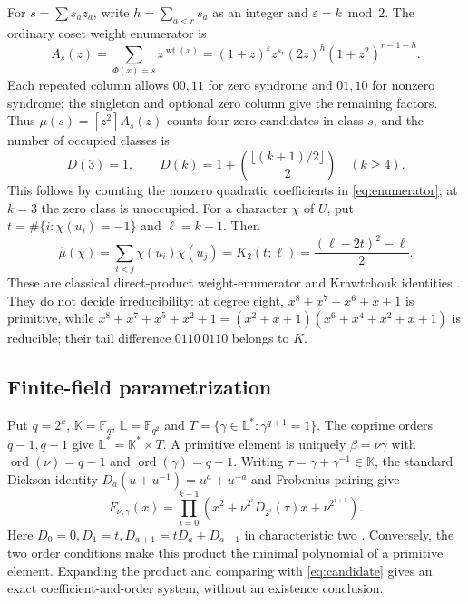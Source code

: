 \documentclass[11pt]{article}
\theoremstyle{definition}
\theoremstyle{remark}
\begin{document}
For $s=\sum s_a z_a$, write $h=\sum_{a<r}s_a$ as an integer and
$\varepsilon=k\bmod2$. The ordinary coset weight enumerator is
\begin{equation}\label{eq:enumerator}
 A_s(z)=\sum_{\Phi(x)=s}z^{\operatorname{wt}(x)}
       =(1+z)^\varepsilon z^{s_r}(2z)^h(1+z^2)^{r-1-h}.
\end{equation}
Each repeated column allows $00,11$ for zero syndrome and $01,10$
for nonzero syndrome; the singleton and optional zero column give the
remaining factors. Thus $\mu(s)=[z^2]A_s(z)$ counts four-zero candidates
in class $s$, and the number of occupied classes is
\begin{equation}\label{eq:Dk}
 D(3)=1,\qquad D(k)=1+\binom{\lfloor(k+1)/2\rfloor}{2}\quad(k\ge4).
\end{equation}
This follows by counting the nonzero quadratic coefficients in
\eqref{eq:enumerator}; at $k=3$ the zero class is unoccupied.
For a character $\chi$ of $U$, put
$t=\#\{i:\chi(u_i)=-1\}$ and $\ell=k-1$. Then
\begin{equation}\label{eq:krawtchouk}
 \widehat\mu(\chi)=\sum_{i<j}\chi(u_i)\chi(u_j)
   =K_2(t;\ell)=\frac{(\ell-2t)^2-\ell}{2}.
\end{equation}
These are classical direct-product weight-enumerator and Krawtchouk
identities \cite[Sections 3--4]{Forney11}\cite[Sections 1.1 and 2.1]{Brouwer18}.
They do not decide irreducibility: at degree eight,
$x^8+x^7+x^6+x+1$ is primitive, while
$x^8+x^7+x^5+x^2+1=(x^2+x+1)(x^6+x^4+x^2+x+1)$ is reducible;
their tail difference $0110\,0110$ belongs to $K$.

\subsection{Finite-field parametrization}\label{sec:dickson}
Put $q=2^k$, $\mathbb K=\mathbb F_q$, $\mathbb L=\mathbb F_{q^2}$ and
$T=\{\gamma\in\mathbb L^*:\gamma^{q+1}=1\}$.
The coprime orders $q-1,q+1$ give $\mathbb L^*=\mathbb K^*\times T$.
A primitive element is uniquely $\beta=\nu\gamma$ with
$\operatorname{ord}(\nu)=q-1$ and $\operatorname{ord}(\gamma)=q+1$.
Writing $\tau=\gamma+\gamma^{-1}\in\mathbb K$, the standard Dickson
identity $D_a(u+u^{-1})=u^a+u^{-a}$ and Frobenius pairing give
\begin{equation}\label{eq:dickson}
 F_{\nu,\gamma}(x)=\prod_{i=0}^{k-1}
 \left(x^2+\nu^{2^i}D_{2^i}(\tau)x+\nu^{2^{i+1}}\right).
\end{equation}
Here $D_0=0,D_1=t,D_{a+1}=tD_a+D_{a-1}$ in characteristic two
\cite{LN}. Conversely, the two order conditions make this product the
minimal polynomial of a primitive element. Expanding the product and
comparing with \eqref{eq:candidate} gives an exact coefficient-and-order
system, without an existence conclusion.
\end{document}

